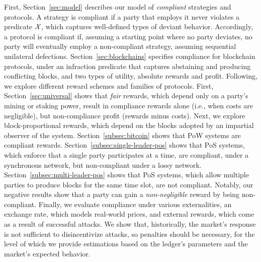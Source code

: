 First, Section~\ref{sec:model} describes our model of \emph{compliant}
strategies and protocols. A strategy is compliant if a party that employs it
never violates a predicate $\mathcal{X}$, which captures well-defined
types of deviant behavior. Accordingly, a protocol is compliant if, assuming a
starting point where no party deviates, no party will eventually employ a
non-compliant strategy, assuming sequential unilateral defections.
Section~\ref{sec:blockchains} specifies compliance for blockchain protocols,
under an infraction predicate that captures abstaining and producing
conflicting blocks, and two types of utility, absolute rewards and profit.
Following, we explore different reward schemes and families of protocols.
First, Section~\ref{sec:universal} shows that \emph{fair} rewards, \ie which
depend only on a party's mining or staking power, result in compliance \wrt
rewards alone (i.e., when costs are negligible), but non-compliance \wrt profit
(rewards minus costs). Next, we explore block-proportional rewards, \ie which
depend on the blocks adopted by an impartial observer of the system.
Section~\ref{subsec:bitcoin} shows that PoW systems are compliant \wrt rewards.
Section~\ref{subsec:single-leader-pos} shows that PoS systems, which enforce
that a single party participates at a time, are compliant, under a synchronous
network, but non-compliant under a lossy network.
Section~\ref{subsec:multi-leader-pos} shows that PoS systems, which allow
multiple parties to produce blocks for the same time slot, are not compliant.
Notably, our negative results show that a party can gain a
\emph{non-negligible} reward by being non-compliant. Finally, we evaluate
compliance under various externalities, \ie an exchange rate, which models
real-world prices, and external rewards, which come as a result of successful
attacks. We show that, historically, the market's response is not sufficient to
disincentivize attacks, so penalties should be necessary, for the level of
which we provide estimations based on the ledger's parameters and the market's
expected behavior.
